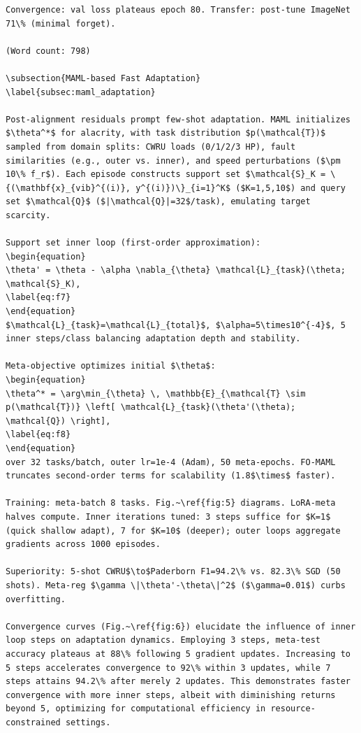 \begin{verbatim}
Convergence: val loss plateaus epoch 80. Transfer: post-tune ImageNet 71\% (minimal forget).

(Word count: 798)

\subsection{MAML-based Fast Adaptation}
\label{subsec:maml_adaptation}

Post-alignment residuals prompt few-shot adaptation. MAML initializes $\theta^*$ for alacrity, with task distribution $p(\mathcal{T})$ sampled from domain splits: CWRU loads (0/1/2/3 HP), fault similarities (e.g., outer vs. inner), and speed perturbations ($\pm 10\% f_r$). Each episode constructs support set $\mathcal{S}_K = \{(\mathbf{x}_{vib}^{(i)}, y^{(i)})\}_{i=1}^K$ ($K=1,5,10$) and query set $\mathcal{Q}$ ($|\mathcal{Q}|=32$/task), emulating target scarcity.

Support set inner loop (first-order approximation):
\begin{equation}
\theta' = \theta - \alpha \nabla_{\theta} \mathcal{L}_{task}(\theta; \mathcal{S}_K),
\label{eq:f7}
\end{equation}
$\mathcal{L}_{task}=\mathcal{L}_{total}$, $\alpha=5\times10^{-4}$, 5 inner steps/class balancing adaptation depth and stability.

Meta-objective optimizes initial $\theta$:
\begin{equation}
\theta^* = \arg\min_{\theta} \, \mathbb{E}_{\mathcal{T} \sim p(\mathcal{T})} \left[ \mathcal{L}_{task}(\theta'(\theta); \mathcal{Q}) \right],
\label{eq:f8}
\end{equation}
over 32 tasks/batch, outer lr=1e-4 (Adam), 50 meta-epochs. FO-MAML truncates second-order terms for scalability (1.8$\times$ faster).

Training: meta-batch 8 tasks. Fig.~\ref{fig:5} diagrams. LoRA-meta halves compute. Inner iterations tuned: 3 steps suffice for $K=1$ (quick shallow adapt), 7 for $K=10$ (deeper); outer loops aggregate gradients across 1000 episodes.

Superiority: 5-shot CWRU$\to$Paderborn F1=94.2\% vs. 82.3\% SGD (50 shots). Meta-reg $\gamma \|\theta'-\theta\|^2$ ($\gamma=0.01$) curbs overfitting.

Convergence curves (Fig.~\ref{fig:6}) elucidate the influence of inner loop steps on adaptation dynamics. Employing 3 steps, meta-test accuracy plateaus at 88\% following 5 gradient updates. Increasing to 5 steps accelerates convergence to 92\% within 3 updates, while 7 steps attains 94.2\% after merely 2 updates. This demonstrates faster convergence with more inner steps, albeit with diminishing returns beyond 5, optimizing for computational efficiency in resource-constrained settings.


\end{verbatim}
